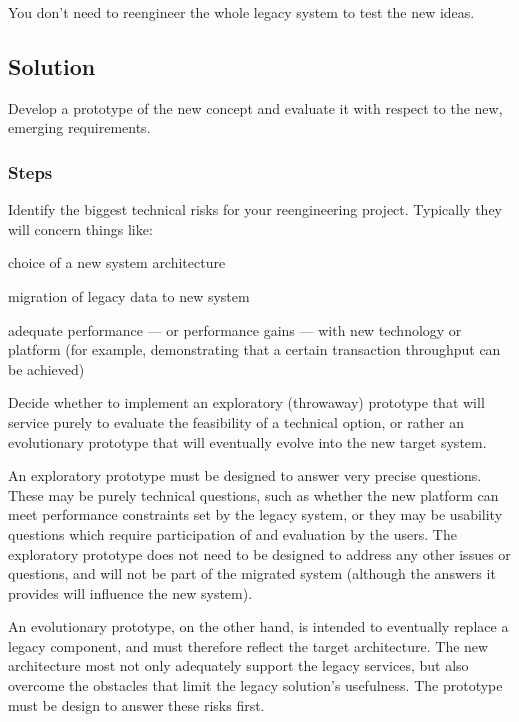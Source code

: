 \documentclass[a4paper,10pt,twoside]{book}
\begin{document}
\begin{bulletlist}
\item You don't need to reengineer the whole legacy system to test the new ideas.
\end{bulletlist}

\subsection*{Solution}

Develop a prototype of the new concept and evaluate it with respect to the new, emerging requirements.

\subsubsection*{Steps}

\begin{bulletlist}
\item Identify the biggest technical risks for your reengineering project. Typically they will concern things like:

\begin{bulletlist}
\item choice of a new system architecture
\item migration of legacy data to new system
\item adequate performance --- or performance gains --- with new technology or platform (for example, demonstrating that a certain transaction throughput can be achieved)
\end{bulletlist}

\item Decide whether to implement an exploratory (\ie throwaway) prototype that will service purely to evaluate the feasibility of a technical option, or rather an evolutionary prototype that will eventually evolve into the new target system.

\begin{bulletlist}
\item An exploratory prototype must be designed to answer very precise questions. These may be purely technical questions, such as whether the new platform can meet performance constraints set by the legacy system, or they may be usability questions which require participation of and evaluation by the users. The exploratory prototype does not need to be designed to address any other issues or questions, and will not be part of the migrated system (although the answers it provides will influence the new system).

\item An evolutionary prototype, on the other hand, is intended to eventually replace a legacy component, and must therefore reflect the target architecture. The new architecture most not only adequately support the legacy services, but also overcome the obstacles that limit the legacy solution's usefulness. The prototype must be design to answer these risks first.
\end{bulletlist}
\end{bulletlist}
\end{document}
